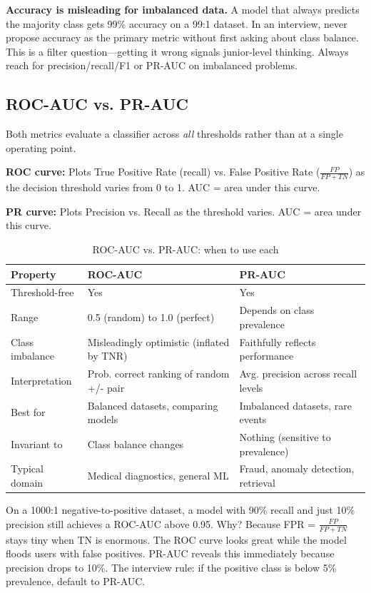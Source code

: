 \begin{warningbox}
\textbf{Accuracy is misleading for imbalanced data.} A model that always predicts the majority class gets 99\% accuracy on a 99:1 dataset. In an interview, never propose accuracy as the primary metric without first asking about class balance. This is a filter question---getting it wrong signals junior-level thinking. Always reach for precision/recall/F1 or PR-AUC on imbalanced problems.
\end{warningbox}

\subsection{ROC-AUC vs. PR-AUC}

Both metrics evaluate a classifier across \textit{all} thresholds rather than at a single operating point.

\textbf{ROC curve:} Plots True Positive Rate (recall) vs. False Positive Rate ($\frac{FP}{FP+TN}$) as the decision threshold varies from 0 to 1. AUC = area under this curve.

\textbf{PR curve:} Plots Precision vs. Recall as the threshold varies. AUC = area under this curve.

\begin{table}[H]
\centering
\caption{ROC-AUC vs. PR-AUC: when to use each}
\begin{tabularx}{\textwidth}{lXX}
\toprule
\textbf{Property} & \textbf{ROC-AUC} & \textbf{PR-AUC} \\
\midrule
Threshold-free & Yes & Yes \\
Range & 0.5 (random) to 1.0 (perfect) & Depends on class prevalence \\
Class imbalance & Misleadingly optimistic (inflated by TNR) & Faithfully reflects performance \\
Interpretation & Prob. correct ranking of random +/- pair & Avg. precision across recall levels \\
Best for & Balanced datasets, comparing models & Imbalanced datasets, rare events \\
Invariant to & Class balance changes & Nothing (sensitive to prevalence) \\
Typical domain & Medical diagnostics, general ML & Fraud, anomaly detection, retrieval \\
\bottomrule
\end{tabularx}
\end{table}

\begin{keyinsight}
On a 1000:1 negative-to-positive dataset, a model with 90\% recall and just 10\% precision still achieves a ROC-AUC above 0.95. Why? Because FPR = $\frac{FP}{FP+TN}$ stays tiny when TN is enormous. The ROC curve looks great while the model floods users with false positives. PR-AUC reveals this immediately because precision drops to 10\%. The interview rule: if the positive class is below 5\% prevalence, default to PR-AUC.
\end{keyinsight}


